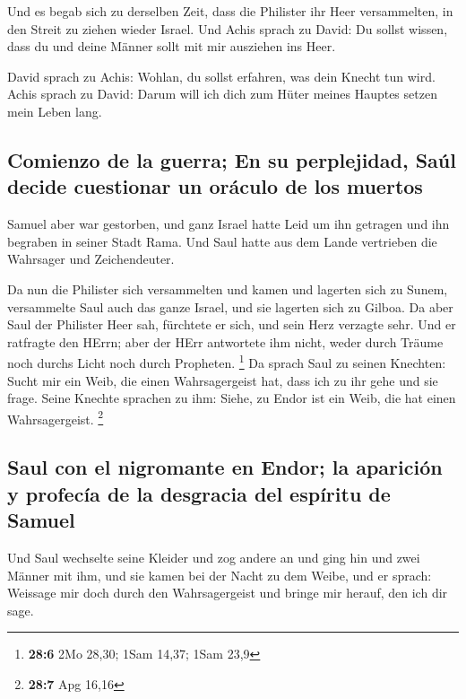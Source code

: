  Und es begab sich zu derselben Zeit, dass die Philister
ihr Heer versammelten, in den Streit zu ziehen wieder Israel. Und Achis
sprach zu David: Du sollst wissen, dass du und deine Männer sollt mit
mir ausziehen ins Heer.

 David sprach zu Achis: Wohlan, du sollst erfahren, was
dein Knecht tun wird. Achis sprach zu David: Darum will ich dich zum
Hüter meines Hauptes setzen mein Leben lang.

\hypertarget{comienzo-de-la-guerra-en-su-perplejidad-sauxfal-decide-cuestionar-un-oruxe1culo-de-los-muertos}{%
\subsection{Comienzo de la guerra; En su perplejidad, Saúl decide
cuestionar un oráculo de los
muertos}\label{comienzo-de-la-guerra-en-su-perplejidad-sauxfal-decide-cuestionar-un-oruxe1culo-de-los-muertos}}

 Samuel aber war gestorben, und ganz Israel hatte Leid um
ihn getragen und ihn begraben in seiner Stadt Rama. Und Saul hatte aus
dem Lande vertrieben die Wahrsager und Zeichendeuter.

 Da nun die Philister sich versammelten und kamen und
lagerten sich zu Sunem, versammelte Saul auch das ganze Israel, und sie
lagerten sich zu Gilboa.  Da aber Saul der Philister Heer
sah, fürchtete er sich, und sein Herz verzagte sehr.  Und
er ratfragte den HErrn; aber der HErr antwortete ihm nicht, weder durch
Träume noch durchs Licht noch durch Propheten. \footnote{\textbf{28:6}
  2Mo 28,30; 1Sam 14,37; 1Sam 23,9}  Da sprach Saul zu
seinen Knechten: Sucht mir ein Weib, die einen Wahrsagergeist hat, dass
ich zu ihr gehe und sie frage. Seine Knechte sprachen zu ihm: Siehe, zu
Endor ist ein Weib, die hat einen Wahrsagergeist. \footnote{\textbf{28:7}
  Apg 16,16}

\hypertarget{saul-con-el-nigromante-en-endor-la-apariciuxf3n-y-profecuxeda-de-la-desgracia-del-espuxedritu-de-samuel}{%
\subsection{Saul con el nigromante en Endor; la aparición y profecía de
la desgracia del espíritu de
Samuel}\label{saul-con-el-nigromante-en-endor-la-apariciuxf3n-y-profecuxeda-de-la-desgracia-del-espuxedritu-de-samuel}}

 Und Saul wechselte seine Kleider und zog andere an und
ging hin und zwei Männer mit ihm, und sie kamen bei der Nacht zu dem
Weibe, und er sprach: Weissage mir doch durch den Wahrsagergeist und
bringe mir herauf, den ich dir sage.

